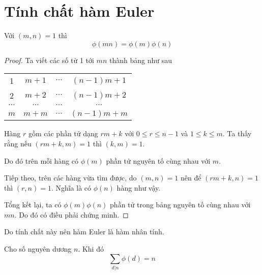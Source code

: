 \section{Tính chất hàm Euler}

\begin{remark}
    Với $(m, n) = 1$ thì $$\phi(m n) = \phi(m) \phi(n)$$
\end{remark}

\begin{proof}
    Ta viết các số từ 1 tới $mn$ thành bảng như sau

    \begin{center}
        \begin{tabular}{c c c c}
            1 & $m+1$ & $\cdots$ & $(n-1)m + 1$ \\
            2 & $m+2$ & $\cdots$ & $(n-1)m + 2$ \\
            $\cdots$ & $\cdots$ & $\cdots$ & $\cdots$ \\
            $m$ & $m+m$ & $\cdots$ & $(n-1)m + m$
        \end{tabular}
    \end{center}
    
    Hàng $r$ gồm các phần tử dạng $r m + k$ với $0 \leq r \leq n-1$ và $1 \leq k \leq m$. 
    Ta thấy rằng nếu $(rm + k, m) = 1$ thì $(k, m) = 1$.

    Do đó trên mỗi hàng có $\phi(m)$ phần tử nguyên tố cùng nhau với $m$.

    Tiếp theo, trên các hàng vừa tìm được, do $(m, n) = 1$ nên để $(rm + k, n) = 1$ thì $(r, n) = 1$.
    Nghĩa là có $\phi(n)$ hàng như vậy.

    Tổng kết lại, ta có $\phi(m) \phi(n)$ phần tử trong bảng nguyên tố cùng nhau với $mn$. Do đó có điều phải chứng minh.
\end{proof}

Do tính chất này nên hàm Euler là hàm nhân tính.

\begin{remark}
    Cho số nguyên dương $n$. Khi đó
    \[\sum_{d | n} \phi(d) = n\]
\end{remark}

